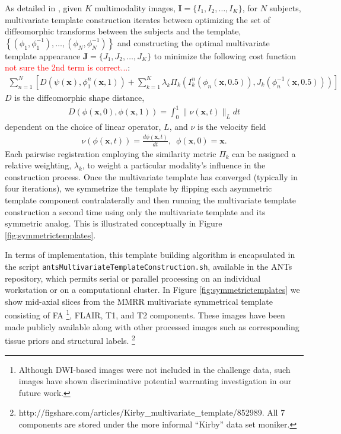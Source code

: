 \documentclass[preprint,authoryear,review,12pt]{elsarticle}
\begin{document}
As detailed in \cite{avants2008,avants2010}, 
given $K$ multimodality images, ${\mathbf I} = \{I_1,I_2,\ldots, I_K\}$, 
for $N$ subjects,  multivariate 
template construction iterates between optimizing the set 
of diffeomorphic transforms between the subjects and the 
template, 
$\left\{\left(\phi_1,\phi_1^{-1}\right),\ldots,\left(\phi_N,\phi_N^{-1}\right)\right\}$ 
and constructing the 
optimal multivariate template appearance 
$\mathbf{J}=\{J_1,J_2,\ldots, J_K\}$ to minimize the
following cost function \textcolor{red}{not sure the 2nd term is correct...}:
\begin{align}
  \sum_{n=1}^N 
        \left[ D \left( \psi(\mathbf{x}),\phi_1^n(\mathbf{x},1)\right)  
        + \sum_{k=1}^K \lambda_k \Pi_k \left(I_k^n\left(\phi_n(\mathbf{x},0.5)\right),J_k\left(\phi^{-1}_n(\mathbf{x},0.5)\right)\right)\right]
\end{align}
$D$ is the diffeomorphic shape distance,
\begin{align}
D\left( \phi( \mathbf{x},0),\phi( \mathbf{x},1)\right) = \int_0^1 \| \nu(\mathbf{x},t)\|_L dt
\end{align}
dependent on the choice of linear operator, $L$, and $\nu$
is the velocity field
\begin{align}
\nu\left( \phi(\mathbf{x},t) \right) = \frac{d\phi(\mathbf{x},t)}{dt},\,\,\, \phi(\mathbf{x},0) = \mathbf{x}.
\end{align}
Each pairwise registration employing the similarity metric $\Pi_k$ can 
be assigned a relative weighting, $\lambda_k$, to weight a particular
modality's influence in the construction process.  Once the multivariate
template has converged (typically in four iterations), we symmetrize
the template by flipping each asymmetric template component contralaterally 
and then running the
multivariate template construction a second time using only the multivariate
template and its symmetric analog.  This is illustrated conceptually in
Figure \ref{fig:symmetrictemplates}.

In terms of implementation, this template building algorithm is 
encapsulated in the script \verb#antsMultivariateTemplateConstruction.sh#,
available in the ANTs repository, which permits serial or parallel processing on
an individual workstation or on a computational cluster.  In
Figure \ref{fig:symmetrictemplates} we show mid-axial slices from
the MMRR multivariate symmetrical template consisting of FA%
\footnote{
Although DWI-based images were not included in the
challenge data, such images have shown discriminative potential 
\citep{price2003,cha2005} warranting investigation in our future
work.  
}, FLAIR,  
T1, and T2 components.  These images have been made publicly available
along with other processed images such as corresponding
tissue priors and structural labels.%
\footnote{
http://figshare.com/articles/Kirby\_multivariate\_template/852989.
All 7 components are stored under the more informal ``Kirby'' data set moniker.
}
\end{document}
